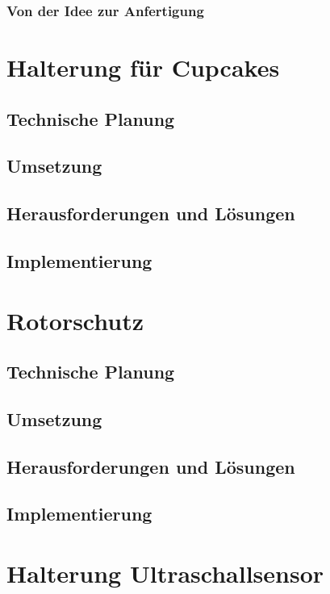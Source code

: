 		\subsubsection{Von der Idee zur Anfertigung}

\section{Halterung für Cupcakes}

	\subsection{Technische Planung}

	\subsection{Umsetzung}

	\subsection{Herausforderungen und Lösungen}

	\subsection{Implementierung}

\section{Rotorschutz}

	\subsection{Technische Planung}

	\subsection{Umsetzung}

	\subsection{Herausforderungen und Lösungen}

	\subsection{Implementierung}

\section{Halterung Ultraschallsensor}

